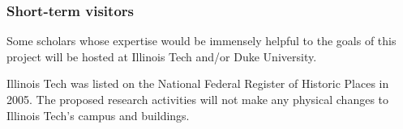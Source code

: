 \documentclass[11pt]{NSFamsart}
\begin{document}


\subsubsection*{Short-term visitors} Some scholars whose expertise would be immensely helpful to the goals of this project will be hosted at Illinois Tech and/or Duke University.

\bigskip \bigskip

Illinois Tech was listed on the National Federal Register of Historic Places in 2005. The proposed 
research activities will not make any physical changes to Illinois Tech's campus and buildings.
\end{document}
